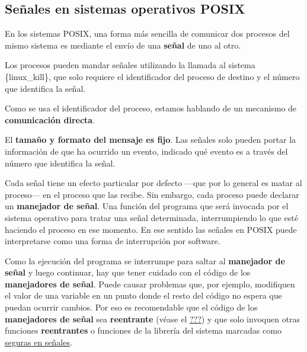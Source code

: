 \subsection{Señales en sistemas operativos
POSIX}\label{_seuxf1ales_en_sistemas_operativos_posix}

En los sistemas POSIX, una forma más sencilla de comunicar dos procesos
del mismo sistema es mediante el envío de una \textbf{{}señal} de uno al
otro.

Los procesos pueden mandar señales utilizando la llamada al sistema
\{linux\_kill\}, que solo requiere el identificador del proceso de
destino y el número que identifica la señal.

\begin{Shaded}
\begin{Highlighting}[]
\OperatorTok{(}\OperatorTok{,}\OperatorTok{);}
\end{Highlighting}
\end{Shaded}

Como se usa el identificador del proceso, estamos hablando de un
mecanismo de \textbf{comunicación directa}.

El \textbf{tamaño y formato del mensaje es fijo}. Las señales solo
pueden portar la información de que ha ocurrido un evento, indicado qué
evento es a través del número que identifica la señal.

Cada señal tiene un efecto particular por defecto ---que por lo general
es matar al proceso--- en el proceso que las recibe. Sin embargo, cada
proceso puede declarar un \textbf{manejador de señal}{}. Una función del
programa que será invocada por el sistema operativo para tratar una
señal determinada, interrumpiendo lo que esté haciendo el proceso en ese
momento. En ese sentido las señales en POSIX puede interpretarse como
una forma de interrupción por software.

Como la ejecución del programa se interrumpe para saltar al
\textbf{manejador de señal} y luego continuar, hay que tener cuidado con
el código de los \textbf{manejadores de señal}. Puede causar problemas
que, por ejemplo, modifiquen el valor de una variable en un punto donde
el resto del código no espera que puedan ocurrir cambios. Por eso es
recomendable que el código de los \textbf{manejadores de señal} sea
\textbf{reentrante} (véase el \hyperref[_funciones_reentrantes]{???}) y
que solo invoquen otras funciones \textbf{reentrantes} o funciones de la
librería del sistema marcadas como
\href{https://man7.org/linux/man-pages/man7/signal-safety.7.html}{seguras
en señales}.

